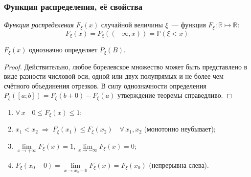 \subsubsection{Функция распределения, её свойства}
\begin{defn}
    \textit{Функция распределения} $F_\xi (x)$ случайной величины $\xi$~--- функция $F_\xi \colon \mathbb{R} \mapsto \mathbb{R}$:
    \begin{equation*}
        F_{\xi}(x) = P_{\xi}\left((-\infty, x)\right) = \mathbb{P}(\xi<x)
    \end{equation*}
\end{defn}

\begin{thm*}
    $F_\xi(x)$ однозначно определяет $P_\xi(B)$.
\end{thm*}
\begin{proof}
    Действительно, любое борелевское множество может быть представлено в виде разности числовой оси, одной или двух полупрямых и не более чем счётного объединения отрезков. 
    В силу однозначности определения $P_\xi([a;b]) = F_\xi(b + 0) - F_\xi(a)$ утверждение теоремы справедливо.
\end{proof}

\begin{namedthm}\leavevmode
\begin{enumerate}
    \item $\forall \, x \quad 0 \leqslant F_\xi(x) \leqslant 1$;
    \item $x_1 < x_2 \; \Rightarrow \; F_\xi(x_1) \leqslant F_\xi(x_2) \quad \forall \, x_1, x_2$ (монотонно неубывает);
    \item $\lim\limits_{x \rightarrow +\infty} F_\xi(x) = 1, \lim\limits_{x \rightarrow -\infty} F_\xi(x) = 0$;
    \item $F_\xi(x_0 - 0) = \lim\limits_{x \rightarrow x_0 - 0}F_\xi(x) = F_\xi(x_0)$ (непрерывна слева).
\end{enumerate}
\end{namedthm}

